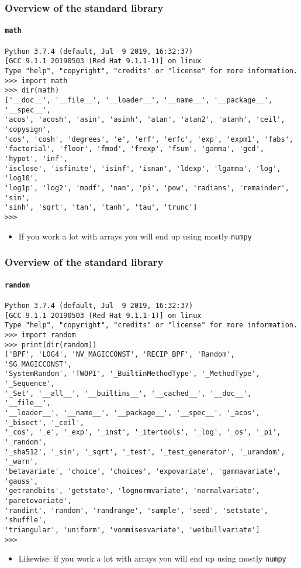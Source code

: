\documentclass[9pt]{beamer}
\begin{document}
\begin{frame}[fragile]
  \frametitle{Overview of the standard library}
  \framesubtitle{\texttt{math}}
  \begin{Verbatim}
Python 3.7.4 (default, Jul  9 2019, 16:32:37)
[GCC 9.1.1 20190503 (Red Hat 9.1.1-1)] on linux
Type "help", "copyright", "credits" or "license" for more information.
>>> import math
>>> dir(math)
['__doc__', '__file__', '__loader__', '__name__', '__package__', '__spec__',
'acos', 'acosh', 'asin', 'asinh', 'atan', 'atan2', 'atanh', 'ceil', 'copysign',
'cos', 'cosh', 'degrees', 'e', 'erf', 'erfc', 'exp', 'expm1', 'fabs',
'factorial', 'floor', 'fmod', 'frexp', 'fsum', 'gamma', 'gcd', 'hypot', 'inf',
'isclose', 'isfinite', 'isinf', 'isnan', 'ldexp', 'lgamma', 'log', 'log10',
'log1p', 'log2', 'modf', 'nan', 'pi', 'pow', 'radians', 'remainder', 'sin',
'sinh', 'sqrt', 'tan', 'tanh', 'tau', 'trunc']
>>>
  \end{Verbatim}

  \medskip

  \begin{itemize}
  \item If you work a lot with arrays you will end up using mostly
    \texttt{numpy}
  \end{itemize}
\end{frame}


\begin{frame}[fragile]
  \frametitle{Overview of the standard library}
  \framesubtitle{\texttt{random}}
  \begin{Verbatim}
Python 3.7.4 (default, Jul  9 2019, 16:32:37)
[GCC 9.1.1 20190503 (Red Hat 9.1.1-1)] on linux
Type "help", "copyright", "credits" or "license" for more information.
>>> import random
>>> print(dir(random))
['BPF', 'LOG4', 'NV_MAGICCONST', 'RECIP_BPF', 'Random', 'SG_MAGICCONST',
'SystemRandom', 'TWOPI', '_BuiltinMethodType', '_MethodType', '_Sequence',
'_Set', '__all__', '__builtins__', '__cached__', '__doc__', '__file__',
'__loader__', '__name__', '__package__', '__spec__', '_acos', '_bisect', '_ceil',
'_cos', '_e', '_exp', '_inst', '_itertools', '_log', '_os', '_pi', '_random',
'_sha512', '_sin', '_sqrt', '_test', '_test_generator', '_urandom', '_warn',
'betavariate', 'choice', 'choices', 'expovariate', 'gammavariate', 'gauss',
'getrandbits', 'getstate', 'lognormvariate', 'normalvariate', 'paretovariate',
'randint', 'random', 'randrange', 'sample', 'seed', 'setstate', 'shuffle',
'triangular', 'uniform', 'vonmisesvariate', 'weibullvariate']
>>>
  \end{Verbatim}

  \medskip

  \begin{itemize}
  \item Likewise: if you work a lot with arrays you will end up using mostly
    \texttt{numpy}
  \end{itemize}
\end{frame}
\end{document}
